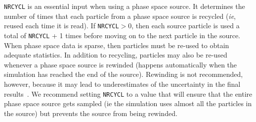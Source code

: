 \documentclass[12pt,twoside]{article}      %
\begin{document}
{\tt NRCYCL} is an essential input when using a phase space source. It
determines the number of times that each particle from a phase space
source is recycled ({\em  ie}, reused each time it is read).
If {\tt NRCYCL}$>$0, then
each source particle is used a total of {\tt NRCYCL} + 1 times
before moving on to the next particle in the source.
When phase space data is sparse, then particles must be re-used to obtain
adequate statistics.  In addition to recycling, particles may also
be re-used whenever a phase space source is rewinded
(happens automatically when the simulation has reached
the end of the source).  Rewinding is not recommended, however,
because it may lead to underestimates of the uncertainty in the
final results~\cite{Wa02a}.  We recommend setting {\tt NRCYCL} to a value
that will ensure that the entire phase space source gets sampled (ie
the simulation uses almost all the particles in the source) but
prevents the source from being rewinded.
\end{document}
